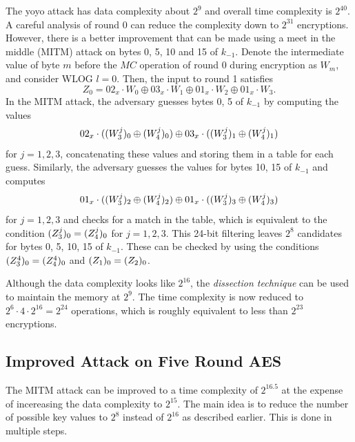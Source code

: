 \documentclass[twoside]{article}
\begin{document}
The yoyo attack has data complexity about \(2^9\) and overall time complexity is
\(2^{40}\). A careful analysis of round 0 can reduce the complexity down to
\(2^{31}\) encryptions. However, there is a better improvement that can be made
using a meet in the middle (MITM) attack on bytes 0, 5, 10 and 15 of \(k_{-1}\).
Denote the intermediate value of byte \(m\) before the \(MC\) operation of round
0 during encryption as \(W_m\), and consider WLOG \(l = 0\). Then, the input to
round 1 satisfies
\begin{equation}
    Z_0 = 02_x \cdot W_0 \oplus 03_x \cdot W_1 \oplus 01_x \cdot W_2 \oplus 01_x \cdot W_3.
    \label{eq:mitm}
\end{equation} 
In the MITM attack, the adversary guesses bytes 0, 5 of \(k_{-1}\) by computing
the values
\begin{equation}
    02_x \cdot ((W_3^j)_0 \oplus (W_4^j)_0) \oplus 03_x \cdot ((W_3^j)_1 \oplus (W_4^j)_1)
    \label{eq:mitm-0-5}
\end{equation}
for \(j = 1, 2, 3\), concatenating these values and storing them in a table for
each guess. Similarly, the adversary guesses the values for bytes 10, 15 of
\(k_{-1}\) and computes 
\begin{equation}
    01_x \cdot ((W_3^j)_2 \oplus (W_4^j)_2) \oplus 01_x \cdot ((W_3^j)_3 \oplus (W_4^j)_3)
    \label{eq:mitm-10-15}
\end{equation}
for \(j = 1, 2, 3\) and checks for a match in the table, which is equivalent to
the condition \((Z_3^j)_0 = (Z_4^j)_0\) for \(j = 1, 2, 3\). This
24-bit filtering leaves \(2^8\) candidates for bytes 0, 5, 10, 15 of \(k_{-1}\).
These can be checked by using the conditions \((Z_3^4)_0 = (Z_4^4)_0\)
and \((Z_1)_0 = (Z_2)_0\).

Although the data complexity looks like \(2^{16}\), the \emph{dissection
technique} can be used to maintain the memory at \(2^9\). The time complexity is
now reduced to \(2^6 \cdot 4 \cdot 2^{16} = 2^{24}\) operations, which is
roughly equivalent to less than \(2^{23}\) encryptions.

\subsection{Improved Attack on Five Round AES}

The MITM attack can be improved to a time complexity of \(2^{16.5}\) at the
expense of incereasing the data complexity to \(2^{15}\). The main idea is to
reduce the number of possible key values to \(2^8\) instead of \(2^{16}\) as
described earlier. This is done in multiple steps.
\end{document}

